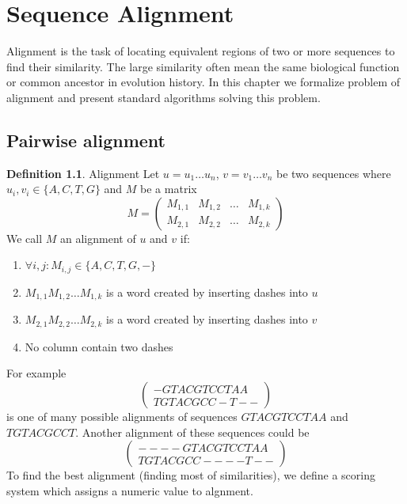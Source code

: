 \chapter{Sequence Alignment}

\label{kap:alignment} %


Alignment is the task of locating equivalent regions of two or more sequences to find their similarity.
The large similarity often mean the same biological function or common ancestor in evolution history.
In this chapter we formalize problem of alignment and present standard algorithms
solving this problem.

\section{Pairwise alignment}

\theoremstyle{definition}
\newtheorem{definition}{Definition}[section]
\theoremstyle{definition}
\begin{definition}{Alignment}
Let $u=u_1 \dots u_n$, $v=v_1 \dots v_n$ be two sequences where $u_i,v_i\in \{A, C, T, G\}$ and $M$ be a matrix
$$M=
\begin{pmatrix}
  M_{1,1} & M_{1,2} & \dots & M_{1,k} \\
  M_{2,1} & M_{2,2} & \dots & M_{2,k}
\end{pmatrix}$$
We call $M$ an alignment of $u$ and $v$ if:
\begin{enumerate}
\item $\forall i,j : M_{i,j}\in \{A,C,T,G,-\}$
\item $M_{1,1} M_{1,2} \dots M_{1,k}$ is a word created by inserting dashes into $u$
\item $M_{2,1} M_{2,2} \dots M_{2,k}$ is a word created by inserting dashes into $v$
\item No column contain two dashes
\end{enumerate}
\end{definition}

For example 
$$
\begin{pmatrix}
   -GTACGTCCTAA \\
   TGTACGCC-T--
\end{pmatrix}$$
is one  of many possible alignments of sequences $GTACGTCCTAA$ and $TGTACGCCT$.
Another alignment of these sequences could be 
$$\begin{pmatrix}
   ----GTACGTCCTAA \\
   TGTACGCC----T--
\end{pmatrix}$$
To find the best alignment (finding most of similarities), we define a scoring system which assigns a numeric value to algnment.

